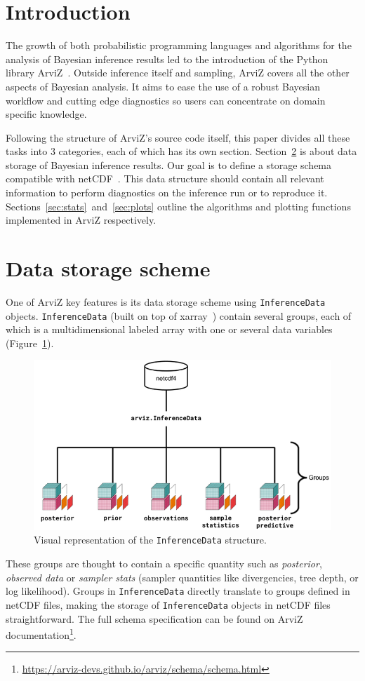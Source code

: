 \documentclass[anonymous=false, %
               format=acmsmall, %
               review=true, %
               screen=true, %
               nonacm=true]{acmart}
\begin{document}
\section{Introduction}
The growth of both probabilistic programming languages and algorithms for the
analysis of Bayesian inference results led to the introduction of the Python
library ArviZ~\cite{arviz2019}. Outside inference itself and sampling, ArviZ covers
all the other aspects of Bayesian analysis. It aims to ease the use of a robust
Bayesian workflow and cutting edge diagnostics so users can concentrate on domain
specific knowledge.

Following the structure of ArviZ's source code itself, this
paper divides all these tasks into 3 categories, each of which has its own
section. Section~\ref{sec:data} is about data storage of Bayesian inference
results. Our goal is to define a storage schema compatible with
netCDF~\cite{unidata2011network}. This data structure should contain all
relevant information to
perform diagnostics on the inference run or to reproduce it.
Sections~\ref{sec:stats}~and~\ref{sec:plots} outline the algorithms and
plotting functions implemented in ArviZ respectively.

\section{Data storage scheme}\label{sec:data}
One of ArviZ key features is its data storage scheme using
\texttt{InferenceData} objects. \texttt{InferenceData} (built on
top of xarray~\cite{hoyer2017xarray}) contain several groups, each of which is
a multidimensional labeled array with one or several data variables
(Figure~\ref{fig:data}).

\begin{figure}[!hbt]
  \centering
  \includegraphics[width=0.6\linewidth]{InferenceDataStructure.png}
  \caption{Visual representation of the \texttt{InferenceData}
  structure.}\label{fig:data}
\end{figure}

These groups are thought to contain a specific quantity such as \emph{posterior},
\emph{observed data} or \emph{sampler stats} (sampler quantities like
divergencies, tree depth, or log likelihood). Groups in \texttt{InferenceData}
directly translate to
groups defined in netCDF files, making the storage of \texttt{InferenceData}
objects in netCDF files straightforward. The full schema specification
can be found on ArviZ
documentation\footnote{\url{https://arviz-devs.github.io/arviz/schema/schema.html}}.
\end{document}
